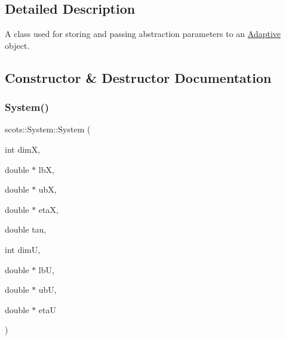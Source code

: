 \subsection{Detailed Description}
A class used for storing and passing abstraction parameters to an \hyperlink{classscots_1_1Adaptive}{Adaptive} object. 

\subsection{Constructor \& Destructor Documentation}
\mbox{\label{classscots_1_1System_a3aabe6325daaccf720eb3cd3864f39ac}} 
\subsubsection{\texorpdfstring{System()}{System()}}
{\footnotesize\ttfamily scots\+::\+System\+::\+System (\begin{DoxyParamCaption}\item[{int}]{dimX,  }\item[{double $\ast$}]{lbX,  }\item[{double $\ast$}]{ubX,  }\item[{double $\ast$}]{etaX,  }\item[{double}]{tau,  }\item[{int}]{dimU,  }\item[{double $\ast$}]{lbU,  }\item[{double $\ast$}]{ubU,  }\item[{double $\ast$}]{etaU }\end{DoxyParamCaption})\hspace{0.3cm}{\ttfamily [inline]}}

